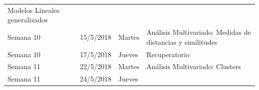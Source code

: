 \documentclass[]{book}
\theoremstyle{definition}
\theoremstyle{definition}
\theoremstyle{definition}
\theoremstyle{remark}
\begin{document}
\begin{longtable}[]{@{}llll@{}}
\begin{minipage}[t]{0.69\columnwidth}
Modelos Lineales generalizados\strut
\end{minipage}\tabularnewline
\begin{minipage}[t]{0.07\columnwidth}\raggedright
Semana 10\strut
\end{minipage} & \begin{minipage}[t]{0.07\columnwidth}\raggedright
15/5/2018\strut
\end{minipage} & \begin{minipage}[t]{0.05\columnwidth}\raggedright
Martes\strut
\end{minipage} & \begin{minipage}[t]{0.69\columnwidth}\raggedright
Análisis Multivariado: Medidas de distancias y similitudes\strut
\end{minipage}\tabularnewline
\begin{minipage}[t]{0.07\columnwidth}\raggedright
Semana 10\strut
\end{minipage} & \begin{minipage}[t]{0.07\columnwidth}\raggedright
17/5/2018\strut
\end{minipage} & \begin{minipage}[t]{0.05\columnwidth}\raggedright
Jueves\strut
\end{minipage} & \begin{minipage}[t]{0.69\columnwidth}\raggedright
Recuperatorio\strut
\end{minipage}\tabularnewline
\begin{minipage}[t]{0.07\columnwidth}\raggedright
Semana 11\strut
\end{minipage} & \begin{minipage}[t]{0.07\columnwidth}\raggedright
22/5/2018\strut
\end{minipage} & \begin{minipage}[t]{0.05\columnwidth}\raggedright
Martes\strut
\end{minipage} & \begin{minipage}[t]{0.69\columnwidth}\raggedright
Análisis Multivariado: Clusters\strut
\end{minipage}\tabularnewline
\begin{minipage}[t]{0.07\columnwidth}\raggedright
Semana 11\strut
\end{minipage} & \begin{minipage}[t]{0.07\columnwidth}\raggedright
24/5/2018\strut
\end{minipage} & \begin{minipage}[t]{0.05\columnwidth}\raggedright
Jueves\strut
\end{minipage} & \begin{minipage}[t]{0.69\columnwidth}\raggedright

\end{minipage}
\end{longtable}
\end{document}
